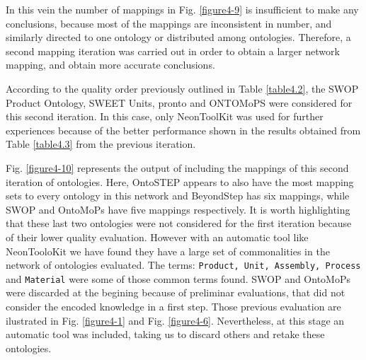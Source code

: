 In this vein the number of mappings in Fig. \ref{figure4-9} is insufficient to make any conclusions, because most of the mappings are inconsistent in number, and similarly directed to one ontology or distributed among ontologies. Therefore, a second mapping iteration   was carried out in order to obtain a larger network mapping, and obtain more accurate conclusions. 

According to the quality order previously outlined in Table \ref{table4.2}, the SWOP Product Ontology, SWEET Units, \gls{pronto} and ONTOMoPS were considered for this second iteration. In this case, only NeonToolKit was used for further experiences because of the better performance shown in the results obtained from Table \ref{table4.3} from the previous iteration. 

Fig. \ref{figure4-10} represents the output of including the mappings of this second iteration of ontologies. Here, OntoSTEP appears to also have the most mapping sets to every ontology in this network and BeyondStep has six mappings, while SWOP and OntoMoPs have five mappings respectively.  It is worth highlighting that these last two ontologies were not considered for the first iteration because of their lower quality evaluation. However with an automatic tool like NeonTooloKit we have found they have a large set of commonalities in the network of ontologies evaluated. The terms: \texttt{Product, Unit, Assembly, Process} and \texttt{Material} were some of those common terms found. SWOP and OntoMoPs were discarded at the begining because of preliminar evaluations, that did not consider the encoded knowledge in a first step. Those previous evaluation are ilustrated in Fig. \ref{figure4-1} and Fig. \ref{figure4-6}. Nevertheless, at this stage an automatic tool was included, taking us to discard others and retake these ontologies.





